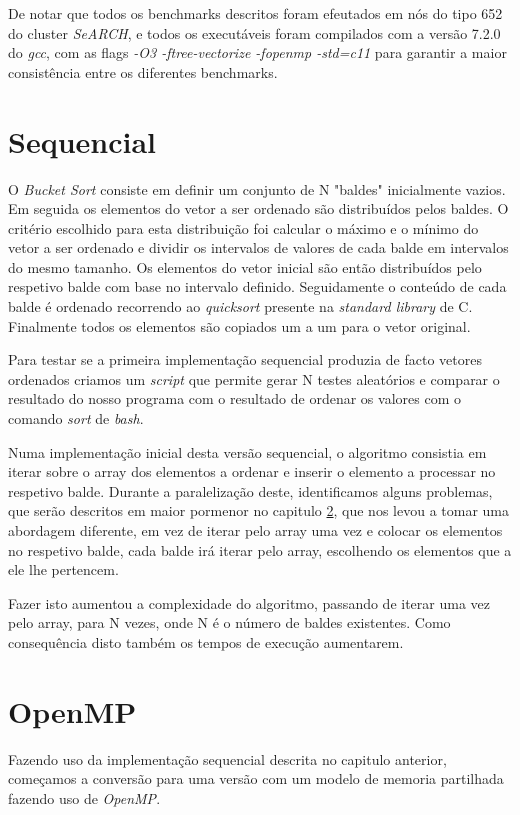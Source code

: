\documentclass[a4paper]{report}
\begin{document}
De notar que todos os benchmarks descritos foram efeutados em nós do tipo 652 do
cluster \textit{SeARCH}, e todos os executáveis foram compilados com a versão
7.2.0 do \textit{gcc}, com as flags \textit{-O3 -ftree-vectorize -fopenmp
-std=c11} para garantir a maior consistência entre os diferentes benchmarks.

\chapter{Sequencial}
O \textit{Bucket Sort} consiste em definir um conjunto de N "baldes"
inicialmente vazios. Em seguida os elementos do vetor a ser ordenado são
distribuídos pelos baldes. O critério escolhido para esta distribuição foi
calcular o máximo e o mínimo do vetor a ser ordenado e dividir os intervalos de
valores de cada balde em intervalos do mesmo tamanho. Os elementos do vetor
inicial são então distribuídos pelo respetivo balde com base no intervalo
definido. Seguidamente o conteúdo de cada balde é ordenado recorrendo ao
\textit{quicksort} presente na \textit{standard library} de C. Finalmente todos
os elementos são copiados um a um para o vetor original.

Para testar se a primeira implementação sequencial produzia de facto vetores
ordenados criamos um \textit{script} que permite gerar N testes aleatórios e
comparar o resultado do nosso programa com o resultado de ordenar os valores
com o comando \textit{sort} de \textit{bash}.

Numa implementação inicial desta versão sequencial, o algoritmo consistia em
iterar sobre o array dos elementos a ordenar e inserir o elemento a processar no
respetivo balde. Durante a paralelização deste, identificamos alguns problemas,
que serão descritos em maior pormenor no capitulo \ref{chap:omp}, que nos levou
a tomar uma abordagem diferente, em vez de iterar pelo array uma vez e colocar
os elementos no respetivo balde, cada balde irá iterar pelo array, escolhendo os
elementos que a ele lhe pertencem.

Fazer isto aumentou a complexidade do algoritmo, passando de iterar uma vez pelo
array, para N vezes, onde N é o número de baldes existentes. Como
consequência disto também os tempos de execução aumentarem.

\chapter{OpenMP} \label{chap:omp}
Fazendo uso da implementação sequencial descrita no capitulo anterior, começamos
a conversão para uma versão com um modelo de memoria partilhada fazendo uso de
\textit{OpenMP}.
\end{document}

